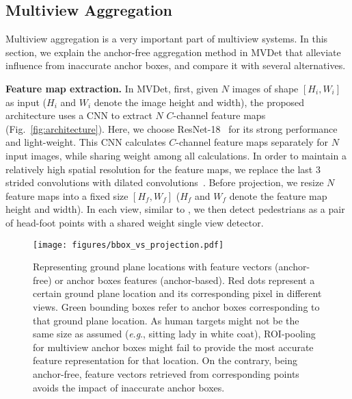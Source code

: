 \documentclass[runningheads]{llncs}
\newcommand{\eg}{\textit{e}.\textit{g}.}
\begin{document}
\subsection{Multiview Aggregation}
\label{sec:sec:aggreagtion}

Multiview aggregation is a very important part of multiview systems. In this section, we explain the anchor-free aggregation method in MVDet that alleviate influence from inaccurate anchor boxes, and compare it with several alternatives. 

\textbf{Feature map extraction. }
In MVDet, first, given $N$ images of shape $\left[H_i,W_i\right]$ as input ($H_i$ and $W_i$ denote the image height and width), the proposed architecture uses a CNN to extract $N$ $C$-channel feature maps (Fig.~\ref{fig:architecture}). Here, we choose ResNet-18~\cite{he2016deep} for its strong performance and light-weight. This CNN calculates $C$-channel feature maps separately for $N$ input images, while sharing weight among all calculations. In order to maintain a relatively high spatial resolution for the feature maps, we replace the last 3 strided convolutions with dilated convolutions~\cite{yu2015multi}. 
Before projection, we resize $N$ feature maps into a fixed size $\left[H_f,W_f\right]$ ($H_f$ and $W_f$ denote the feature map height and width). 
In each view, similar to \cite{law2018cornernet,song2018small}, we then detect pedestrians as a pair of head-foot points with a shared weight single view detector. 



\begin{figure}[t]
    \centering
    \texttt{[image: figures/bbox\_vs\_projection.pdf]}
    \caption{Representing ground plane locations with feature vectors (anchor-free) or anchor boxes features (anchor-based). Red dots represent a certain ground plane location and its corresponding pixel in different views. Green bounding boxes refer to anchor boxes corresponding to that ground plane location. As human targets might not be the same size as assumed (\eg, sitting lady in white coat), ROI-pooling for multiview anchor boxes might fail to provide the most accurate feature representation for that location. On the contrary, being anchor-free, feature vectors retrieved from corresponding points avoids the impact of inaccurate anchor boxes. 
    }
    \label{fig:bbox_vs_projection}
\end{figure}
\end{document}
